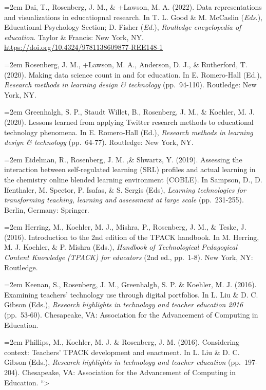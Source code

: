 \documentclass[
  14,
]{article}
\begin{document}
\hangindent=2em Dai, T., Rosenberg, J. M., \& +Lawson, M. A. (2022).
Data representations and visualizations in educatiopnal research. In T.
L. Good \& M. McCaslin (\emph{Eds.}), Educational Psychology Section; D.
Fisher (\emph{Ed.}), \emph{Routledge encyclopedia of education}. Taylor
\& Francis: New York, NY.
\url{https://doi.org/10.4324/9781138609877-REE148-1}

\hangindent=2em Rosenberg, J. M., +Lawson, M. A., Anderson, D. J., \&
Rutherford, T. (2020). Making data science count in and for education.
In E. Romero-Hall (Ed.), \emph{Research methods in learning design \&
technology} (pp.~94-110). Routledge: New York, NY.

\hangindent=2em Greenhalgh, S. P., Staudt Willet, B., Rosenberg, J. M.,
\& Koehler, M. J. (2020). Lessons learned from applying Twitter research
methods to educational technology phenomena. In E. Romero-Hall (Ed.),
\emph{Research methods in learning design \& technology} (pp.~64-77).
Routledge: New York, NY.

\hangindent=2em Eidelman, R., Rosenberg, J. M. ,\& Shwartz, Y. (2019).
Assessing the interaction between self-regulated learning (SRL) profiles
and actual learning in the chemistry online blended learning environment
(COBLE). In Sampson, D., D. Ifenthaler, M. Spector, P. Isafas, \& S.
Sergis (Eds), \emph{Learning technologies for transforming teaching,
learning and assessment at large scale} (pp.~231-255). Berlin, Germany:
Springer.

\hangindent=2em Herring, M., Koehler, M. J., Mishra, P., Rosenberg, J.
M., \& Teske, J. (2016). Introduction to the 2nd edition of the TPACK
handbook. In M. Herring, M. J. Koehler, \& P. Mishra (Eds.),
\emph{Handbook of Technological Pedagogical Content Knowledge (TPACK)
for educators} (2nd ed., pp.~1-8). New York, NY: Routledge.

\hangindent=2em Keenan, S., Rosenberg, J. M., Greenhalgh, S. P. \&
Koehler, M. J. (2016). Examining teachers' technology use through
digital portfolios. In L. Liu \& D. C. Gibson (Eds.), \emph{Research
highlights in technology and teacher education 2016} (pp.~53-60).
Chesapeake, VA: Association for the Advancement of Computing in
Education.

\hangindent=2em Phillips, M., Koehler, M. J. \& Rosenberg, J. M. (2016).
Considering context: Teachers' TPACK development and enactment. In L.
Liu \& D. C. Gibson (Eds.), \emph{Research highlights in technology and
teacher education} (pp.~197-204). Chesapeake, VA: Association for the
Advancement of Computing in Education. ``\textgreater{}
\end{document}
